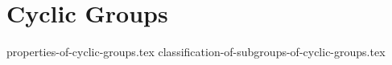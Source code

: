 \chapter{Cyclic Groups}
{properties-of-cyclic-groups.tex}
{classification-of-subgroups-of-cyclic-groups.tex}
